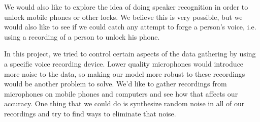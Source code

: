 \documentclass{article}
\begin{document}
We would also like to explore the idea of doing speaker recognition in order to unlock mobile phones or other locks. We believe this is very possible, but we would also like to see if we could catch any attempt to forge a person’s voice, i.e. using a recording of a person to unlock his phone.

In this project, we tried to control certain aspects of the data gathering by using a specific voice recording device. Lower quality microphones would introduce more noise to the data, so making our model more robust to these recordings would be another problem to solve. We’d like to gather recordings from microphones on mobile phones and computers and see how that affects our accuracy. One thing that we could do is synthesize random noise in all of our recordings and try to find ways to eliminate that noise.

\appendix




\end{document}
